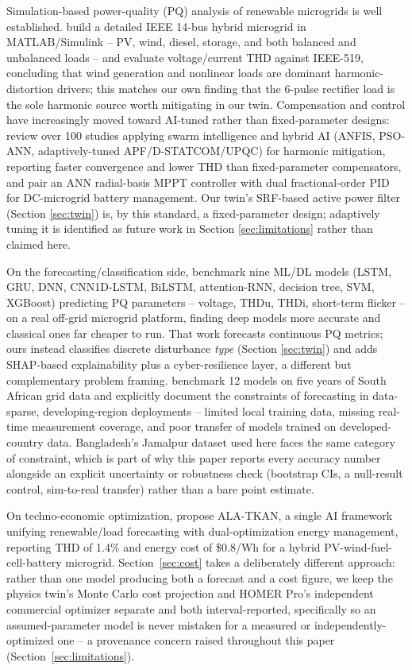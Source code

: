 \documentclass[conference]{IEEEtran}
\begin{document}
Simulation-based power-quality (PQ) analysis of renewable microgrids
is well established. \cite{hernandezmayoral2024pq} build a detailed
IEEE 14-bus hybrid microgrid in MATLAB/Simulink -- PV, wind, diesel,
storage, and both balanced and unbalanced loads -- and evaluate
voltage/current THD against IEEE-519, concluding that wind generation
and nonlinear loads are dominant harmonic-distortion drivers; this
matches our own finding that the 6-pulse rectifier load is the sole
harmonic source worth mitigating in our twin. Compensation and control
have increasingly moved toward AI-tuned rather than fixed-parameter
designs: \cite{john2026aipqreview} review over 100 studies applying
swarm intelligence and hybrid AI (ANFIS, PSO-ANN, adaptively-tuned
APF/D-STATCOM/UPQC) for harmonic mitigation, reporting faster
convergence and lower THD than fixed-parameter compensators, and
\cite{prakash2025aidcmicrogrid} pair an ANN radial-basis MPPT
controller with dual fractional-order PID for DC-microgrid battery
management. Our twin's SRF-based active power filter (Section
\ref{sec:twin}) is, by this standard, a fixed-parameter design;
adaptively tuning it is identified as future work in Section
\ref{sec:limitations} rather than claimed here.

On the forecasting/classification side, \cite{jahan2026mlpq} benchmark
nine ML/DL models (LSTM, GRU, DNN, CNN1D-LSTM, BiLSTM, attention-RNN,
decision tree, SVM, XGBoost) predicting PQ parameters -- voltage,
THDu, THDi, short-term flicker -- on a real off-grid microgrid
platform, finding deep models more accurate and classical ones far
cheaper to run. That work forecasts continuous PQ metrics; ours
instead classifies discrete disturbance \emph{type} (Section
\ref{sec:twin}) and adds SHAP-based explainability plus a
cyber-resilience layer, a different but complementary problem framing.
\cite{osifeko2025aiforecasting} benchmark 12 models on five years of
South African grid data and explicitly document the constraints of
forecasting in data-sparse, developing-region deployments -- limited
local training data, missing real-time measurement coverage, and poor
transfer of models trained on developed-country data. Bangladesh's
Jamalpur dataset used here faces the same category of constraint,
which is part of why this paper reports every accuracy number
alongside an explicit uncertainty or robustness check (bootstrap CIs,
a null-result control, sim-to-real transfer) rather than a bare point
estimate.

On techno-economic optimization, \cite{daniel2025dualopt} propose
ALA-TKAN, a single AI framework unifying renewable/load forecasting
with dual-optimization energy management, reporting THD of 1.4\% and
energy cost of \$0.8/Wh for a hybrid PV-wind-fuel-cell-battery
microgrid. Section~\ref{sec:cost} takes a deliberately different
approach: rather than one model producing both a forecast and a cost
figure, we keep the physics twin's Monte Carlo cost projection and
HOMER Pro's independent commercial optimizer separate and both
interval-reported, specifically so an assumed-parameter model is never
mistaken for a measured or independently-optimized one -- a provenance
concern raised throughout this paper (Section~\ref{sec:limitations}).
\end{document}
